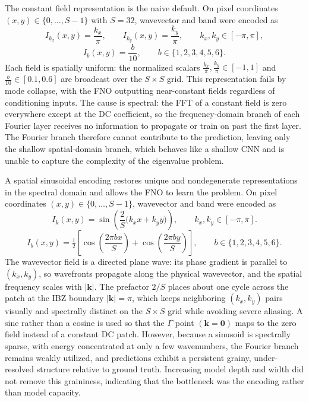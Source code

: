\documentclass[preprint,review,12pt,numafflabel]{elsarticle}
\begin{document}
The constant field representation is the naive default. On pixel coordinates $(x,y)\in\{0,\ldots,S-1\}$ with $S=32$, wavevector and band were encoded as
\[
I_{k_x}(x,y)=\frac{k_x}{\pi},\qquad I_{k_y}(x,y)=\frac{k_y}{\pi},\qquad k_x,k_y\in[-\pi,\pi],
\]
\[
I_b(x,y)=\frac{b}{10},\qquad b\in\{1,2,3,4,5,6\}.
\]
Each field is spatially uniform: the normalized scalars $\frac{k_x}{\pi},\frac{k_y}{\pi}\in[-1,1]$ and $\frac{b}{10}\in[0.1,0.6]$ are broadcast over the $S\times S$ grid. This representation fails by mode collapse, with the FNO outputting near-constant fields regardless of conditioning inputs. The cause is spectral: the FFT of a constant field is zero everywhere except at the DC coefficient, so the frequency-domain branch of each Fourier layer receives no information to propagate or train on past the first layer. The Fourier branch therefore cannot contribute to the prediction, leaving only the shallow spatial-domain branch, which behaves like a shallow CNN and is unable to capture the complexity of the eigenvalue problem.

A spatial sinusoidal encoding restores unique and nondegenerate representations in the spectral domain and allows the FNO to learn the problem. On pixel coordinates $(x,y)\in\{0,\ldots,S-1\}$, wavevector and band were encoded as
\[
I_k(x,y)=\sin\!\left(\frac{2}{S}\bigl(k_x x+k_y y\bigr)\right),\qquad k_x,k_y\in[-\pi,\pi].
\]
\[
I_b(x,y)=\tfrac{1}{2}\left[\cos\!\left(\frac{2\pi b x}{S}\right)+\cos\!\left(\frac{2\pi b y}{S}\right)\right],\qquad b\in\{1,2,3,4,5,6\}.
\]
The wavevector field is a directed plane wave: its phase gradient is parallel to $(k_x,k_y)$, so wavefronts propagate along the physical wavevector, and the spatial frequency scales with $|\mathbf{k}|$. The prefactor $2/S$ places about one cycle across the patch at the IBZ boundary $|\mathbf{k}|=\pi$, which keeps neighboring $(k_x,k_y)$ pairs visually and spectrally distinct on the $S\times S$ grid while avoiding severe aliasing. A sine rather than a cosine is used so that the $\Gamma$ point $(\mathbf{k}=\mathbf{0})$ maps to the zero field instead of a constant DC patch.
However, because a sinusoid is spectrally sparse, with energy concentrated at only a few wavenumbers, the Fourier branch remains weakly utilized, and predictions exhibit a persistent grainy, under-resolved structure relative to ground truth. Increasing model depth and width did not remove this graininess, indicating that the bottleneck was the encoding rather than model capacity.
\end{document}

